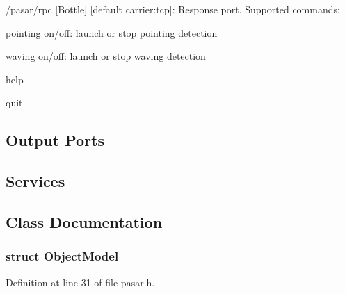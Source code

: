 \begin{DoxyItemize}
\item /pasar/rpc \mbox{[}Bottle\mbox{]} \mbox{[}default carrier\+:tcp\mbox{]}\+: Response port. Supported commands\+:
\begin{DoxyItemize}
\item pointing on/off\+: launch or stop pointing detection
\item waving on/off\+: launch or stop waving detection
\item help
\item quit
\end{DoxyItemize}
\end{DoxyItemize}\hypertarget{group__touchDetector_outputports_sec}{}\subsection{Output Ports}\label{group__touchDetector_outputports_sec}
\hypertarget{group__touchDetector_services_sec}{}\subsection{Services}\label{group__touchDetector_services_sec}


\subsection{Class Documentation}
\label{structObjectModel}
\subsubsection{struct Object\+Model}


Definition at line 31 of file pasar.\+h.

